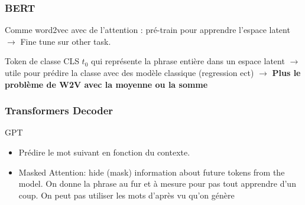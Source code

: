 \documentclass{article}
\theoremstyle{plain}%
\theoremstyle{definition}
\theoremstyle{remark}
\begin{document}
\subsubsection{BERT}
Comme word2vec avec de l'attention : pré-train pour apprendre l'espace latent $\rightarrow$ Fine tune sur other task. 

Token de classe CLS $t_0$ qui représente la phrase entière dans un espace latent $\rightarrow$ utile pour prédire la classe avec des modèle classique (regression ect) $\rightarrow$ \textbf{Plus le problème de W2V avec la moyenne ou la somme}

\subsubsection{Transformers Decoder}
GPT
\begin{itemize}
    \item Prédire le mot suivant en fonction du contexte.
    \item Masked Attention: hide (mask) information about future tokens from the model. On donne la phrase au fur et à mesure pour pas tout apprendre d'un coup. On peut pas utiliser les mots d'après vu qu'on génère
\end{itemize}
\end{document}
